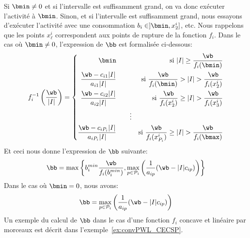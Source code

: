 Si $\bmin\neq 0$ et si l'intervalle est suffisamment grand, on va donc
exécuter l'activité à $\bmin$. Sinon, et si l'intervalle est
suffisamment grand, nous essayons d'exécuter l'activité avec une
consommation $b_i \in ]\bmin,x_2^i]$, etc. Nous rappelons que les
points $x_\ell^i$ correspondent aux points de rupture de la fonction
$f_i$. Dans le cas où $\bmin \neq 0$, l'expression de $\bb$ est
formalisée ci-dessous:
\[f_i^{-1}\left(\frac{\wb}{|I|}\right)=\left\{
    \begin{aligned}
      \bmin & \qquad & \text{si } |I| \ge \frac{\wb}{f_i(\bmin)}\\
      \frac{\wb -c_{i1}|I|}{a_{i1}|I|} & \qquad & \text{si } \frac{\wb}{f_i(\bmin)}
      > |I| > \frac{\wb}{f_i(x^i_2)} \\
      \frac{\wb -c_{i2}|I|}{a_{i2}|I|} & \qquad & \text{si }  \frac{\wb}{f_i(x^i_2)}
      \ge |I| > \frac{\wb}{f_i(x^i_3)}\\
      & \qquad \vdots& \\
      \frac{\wb -c_{iP_i}|I|}{a_{iP_i}|I|} & \qquad & \text{si }  \frac{\wb}{f_i(x^i_{P_i})}
      \ge |I| > \frac{\wb}{f_i(\bmax)}\end{aligned}
  \right.
\]
Et ceci nous donne l'expression de $\bb$ suivante:
\begin{equation}
  \bb= 
  \max \left\{b_i^{min} \frac{\wb}{f_i(b_i^{min})},
    \max_{ p \in \P_i} \left(\frac{1}{a_{ip}}(\wb-|I|c_{ip})\right)\right\}
\label{eq:conv_CECSP}
\end{equation}
Dans le cas où $\bmin=0$, nous avons: 
\[
  \bb= 
  \max_{ p \in \P_i} \left(\frac{1}{a_{ip}}(\wb-|I|c_{ip})\right)
\]
Un exemple du calcul de $\bb$ dans le cas d'une fonction $f_i$ concave
et linéaire par morceaux est décrit dans
l'exemple~\ref{ex:convPWL_CECSP}.

